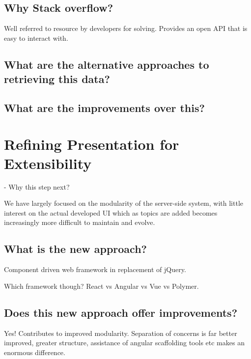 \subsection{Why Stack overflow?}

Well referred to resource by developers for solving. Provides an open API that is easy to interact with.

\subsection{What are the alternative approaches to retrieving this data?}

\subsection{What are the improvements over this?}

\section{Refining Presentation for Extensibility}

- Why this step next?

We have largely focused on the modularity of the server-side system, with little interest on the actual developed UI which as topics are added becomes increasingly more difficult to maintain and evolve.

\subsection{What is the new approach?}

Component driven web framework in replacement of jQuery. 

Which framework though? React vs Angular vs Vue vs Polymer.

\subsection{Does this new approach offer improvements?}

Yes! Contributes to improved modularity. Separation of concerns is far better improved, greater structure, assistance of angular scaffolding tools etc makes an enormous difference.

%
%
%
%
%
%
%
%